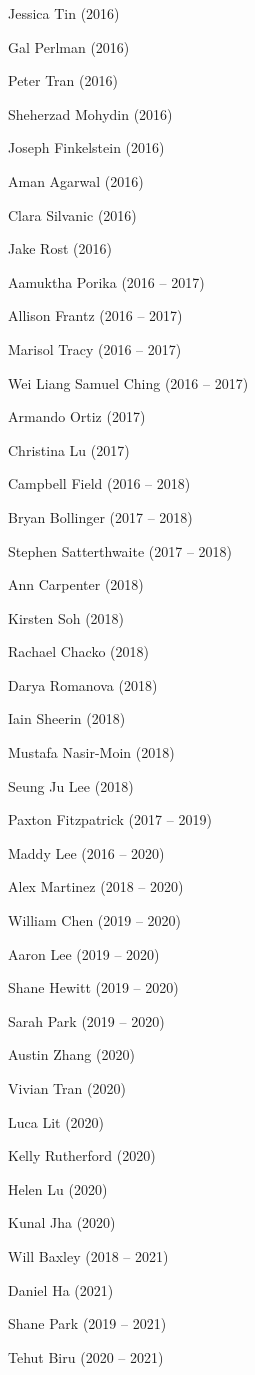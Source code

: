 \documentclass{tufte-book} %
\begin{document}
\begin{fullwidth}
\begin{multicols}{2}\raggedcolumns
\begin{list}{\quad}{}
\item Jessica Tin (2016)
\item Gal Perlman (2016)
\item Peter Tran (2016)
\item Sheherzad Mohydin (2016)
\item Joseph Finkelstein (2016)
\item Aman Agarwal (2016)
\item Clara Silvanic (2016)
\item Jake Rost (2016)
\item Aamuktha Porika (2016 -- 2017)
\item Allison Frantz (2016 -- 2017)
\item Marisol Tracy (2016 -- 2017)
\item Wei Liang Samuel Ching (2016 -- 2017)
\item Armando Ortiz (2017)
\item Christina Lu (2017)
\item Campbell Field (2016 -- 2018)
\item Bryan Bollinger (2017 -- 2018)
\item Stephen Satterthwaite (2017 -- 2018)
\item Ann Carpenter (2018)
\item Kirsten Soh (2018)
\item Rachael Chacko (2018)
\item Darya Romanova (2018)
\item Iain Sheerin (2018)
\item Mustafa Nasir-Moin (2018)
\item Seung Ju Lee (2018)
\item Paxton Fitzpatrick (2017 -- 2019)
\item Maddy Lee (2016 -- 2020)
\item Alex Martinez (2018 -- 2020)
\item William Chen (2019 -- 2020)
\item Aaron Lee (2019 -- 2020)
\item Shane Hewitt (2019 -- 2020)
\item Sarah Park (2019 -- 2020)
\item Austin Zhang (2020)
\item Vivian Tran (2020)
\item Luca Lit (2020)
\item Kelly Rutherford (2020)
\item Helen Lu (2020)
\item Kunal Jha (2020)
\item Will Baxley (2018 -- 2021)
\item Daniel Ha (2021)
\item Shane Park (2019 -- 2021)
\item Tehut Biru (2020 -- 2021)

\end{list}
\end{multicols}
\end{fullwidth}
\end{document}
